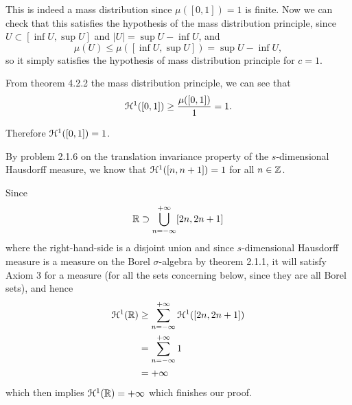 \begin{itemize}
\begin{itemize}
        This is indeed a mass distribution since \(\mu([0, 1]) = 1\) is finite. Now we can check that this satisfies the hypothesis of the mass distribution principle, since \(U \subset [\inf U, \sup U]\) and \(|U| = \sup U - \inf U\), and
        \[\mu (U) \leq \mu ([\inf U, \sup U]) = \sup U - \inf U,\]
        so it simply satisfies the hypothesis of mass distribution principle for \(c = 1\).

        From theorem 4.2.2 the mass distribution principle, we can see that
        \[
        \mathcal{H}^1([0, 1]) \geq \frac{\mu([0, 1])}{1} = 1.
        \]
    \end{itemize}

    Therefore \(\mathcal{H}^1([0, 1]) = 1\).
    
    By problem 2.1.6 on the translation invariance property of the \(s\)-dimensional Hausdorff measure, we know that \(\mathcal{H}^1([n, n + 1]) = 1\) for all \(n \in \mathbb{Z}\).
    
    Since
    \[\mathbb{R} \supset \bigcup_{n = -\infty}^{+\infty} [2n, 2n + 1]\]
    where the right-hand-side is a disjoint union and since \(s\)-dimensional Hausdorff measure is a measure on the Borel \(\sigma\)-algebra by theorem 2.1.1, it will satisfy Axiom 3 for a measure (for all the sets concerning below, since they are all Borel sets), and hence
    \begin{align*}
        \mathcal{H}^1(\mathbb{R}) &\geq \sum_{n = -\infty}^{+\infty} \mathcal{H}^1([2n, 2n + 1])\\
        &= \sum_{n = -\infty}^{+\infty} 1\\
        &= +\infty
    \end{align*}
    which then implies \(\mathcal{H}^1(\mathbb{R}) = +\infty\) which finishes our proof.
\end{itemize}


